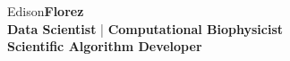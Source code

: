 
\begin{center}
    {\fontsize{50}{60}\selectfont Edison\bf Florez} \\[5mm]
    {\textcolor{my_blue}{\bf\large Data Scientist} |
    \textcolor{my_blue}{\bf\large Computational Biophysicist}} \\
    {\textcolor{my_blue}{\bf\large Scientific Algorithm Developer }} \\
\end{center}



